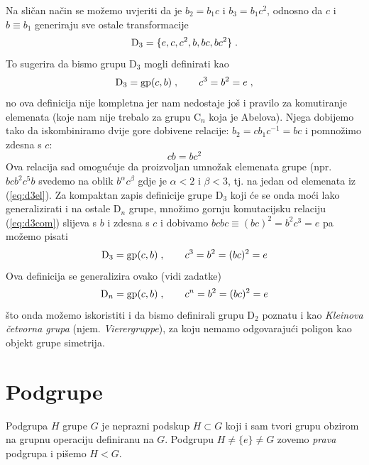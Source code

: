 \begin{primjer}
Na sličan način se možemo uvjeriti da je $b_2 = b_1 c $
i $b_3 = b_1 c^2 $, odnosno da 
$c$ i $b\equiv b_1$ generiraju sve ostale transformacije
\begin{equation}
{\rm D}_3=\{e,c,c^2,b,bc,bc^2\} \;.
\label{eq:d3el}
\end{equation}
To sugerira da bismo grupu D$_3$ mogli definirati kao
\begin{equation}
 {\rm D}_3={\rm gp}(c, b) \;, \qquad c^3 = b^2 = e  \;,
\label{eq:d3gp1}
\end{equation}
no ova definicija nije kompletna jer nam nedostaje još
i pravilo za komutiranje elemenata (koje nam nije trebalo
za grupu C$_n$ koja je Abelova). Njega dobijemo tako da
iskombiniramo dvije gore dobivene relacije: 
$b_2 = c b_1 c^{-1} = b c$ i pomnožimo zdesna s $c$:
\begin{equation}
c b = b c^2
\label{eq:d3com}
\end{equation}
Ova relacija sad omogućuje da proizvoljan umnožak elemenata
grupe (npr. $b c b^2 c^5 b$ svedemo na oblik $b^\alpha c^\beta$ gdje
je $\alpha<2$ i $\beta<3$, tj. na jedan od elemenata iz (\ref{eq:d3el}).
Za kompaktan zapis definicije grupe D$_3$ koji će se onda moći
lako generalizirati i na ostale D$_n$ grupe, množimo gornju
komutacijsku relaciju (\ref{eq:d3com}) slijeva s $b$ i zdesna s $c$
i dobivamo  $ bcbc \equiv (bc)^2 = b^2 c^3 = e$ pa možemo
pisati
\begin{equation}
 {\rm D}_3={\rm gp}(c,b) \;, \qquad c^3 = b^2 = (bc)^2 = e
\label{eq:d3gp}
\end{equation}
Ova definicija se generalizira ovako (vidi zadatke)
\begin{equation}
 {\rm D}_n={\rm gp}(c,b) \;, \qquad c^n = b^2 = (bc)^2 = e
\label{eq:dngp}
\end{equation}
što onda možemo iskoristiti i da bismo definirali grupu
D$_2$ poznatu i kao
\emph{Kleinova četvorna grupa} (njem. \emph{Vierergruppe}), 
za koju nemamo odgovarajući poligon kao objekt grupe simetrija.
\end{primjer}


\section{Podgrupe}

\begin{definicija}[Podgrupa]
Podgrupa $H$ grupe $G$ je neprazni podskup $H\subset G$ koji i sam
tvori grupu obzirom na grupnu operaciju definiranu na $G$.
Podgrupu $H\neq\{e\}\neq G$ zovemo \emph{prava} podgrupa i pišemo $H<G$.
\end{definicija}

